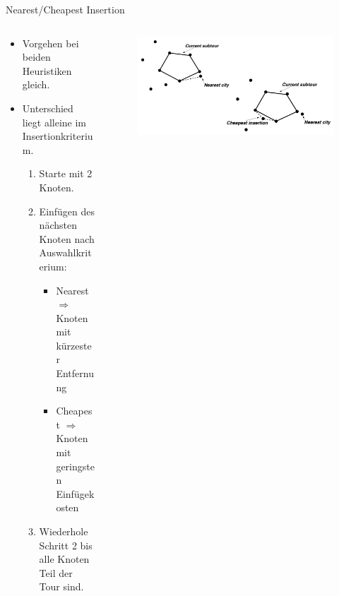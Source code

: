 \begin{frame}{Nearest/Cheapest Insertion}
\begin{columns}
	  \begin{column}{0.45\textwidth}
	\begin{itemize}
		\item Vorgehen bei beiden Heuristiken gleich.
      	\item Unterschied liegt alleine im Insertionkriterium.
	\begin{enumerate}
       	\item Starte mit 2 Knoten.
        \item Einfügen des nächsten Knoten nach Auswahlkriterium:
        	\begin{itemize}
            	\item Nearest $\Rightarrow$ Knoten mit kürzester Entfernung
            	\item Cheapest $\Rightarrow$ Knoten mit geringsten Einfügekosten
            \end{itemize}
        \item Wiederhole Schritt 2 bis alle Knoten Teil der Tour sind.
        \end{enumerate}
	\end{itemize}
	  \end{column}
      \begin{column}{0.55\textwidth}
        \begin{figure} 
        	\includegraphics[scale=0.20]{NICI.png}
        \end{figure}
  	  \end{column}
  \end{columns}
\end{frame}